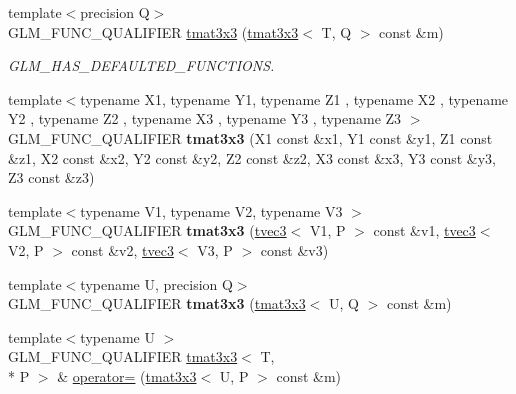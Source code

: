 \begin{DoxyCompactItemize}
\item 
\hypertarget{structglm_1_1tmat3x3_a7d0662c2d46d1709c245e21181f3adff}{{\footnotesize template$<$precision Q$>$ }\\G\-L\-M\-\_\-\-F\-U\-N\-C\-\_\-\-Q\-U\-A\-L\-I\-F\-I\-E\-R \hyperlink{structglm_1_1tmat3x3_a7d0662c2d46d1709c245e21181f3adff}{tmat3x3} (\hyperlink{structglm_1_1tmat3x3}{tmat3x3}$<$ T, Q $>$ const \&m)}\label{structglm_1_1tmat3x3_a7d0662c2d46d1709c245e21181f3adff}

\begin{DoxyCompactList}\small\item\em G\-L\-M\-\_\-\-H\-A\-S\-\_\-\-D\-E\-F\-A\-U\-L\-T\-E\-D\-\_\-\-F\-U\-N\-C\-T\-I\-O\-N\-S. \end{DoxyCompactList}\item 
\hypertarget{structglm_1_1tmat3x3_a5749217af8cef0e358589308774bf132}{{\footnotesize template$<$typename X1, typename Y1, typename Z1 , typename X2 , typename Y2 , typename Z2 , typename X3 , typename Y3 , typename Z3 $>$ }\\G\-L\-M\-\_\-\-F\-U\-N\-C\-\_\-\-Q\-U\-A\-L\-I\-F\-I\-E\-R {\bfseries tmat3x3} (X1 const \&x1, Y1 const \&y1, Z1 const \&z1, X2 const \&x2, Y2 const \&y2, Z2 const \&z2, X3 const \&x3, Y3 const \&y3, Z3 const \&z3)}\label{structglm_1_1tmat3x3_a5749217af8cef0e358589308774bf132}

\item 
\hypertarget{structglm_1_1tmat3x3_a065a41b6dbbc35bc4785e7f429359a2f}{{\footnotesize template$<$typename V1, typename V2, typename V3 $>$ }\\G\-L\-M\-\_\-\-F\-U\-N\-C\-\_\-\-Q\-U\-A\-L\-I\-F\-I\-E\-R {\bfseries tmat3x3} (\hyperlink{structglm_1_1tvec3}{tvec3}$<$ V1, P $>$ const \&v1, \hyperlink{structglm_1_1tvec3}{tvec3}$<$ V2, P $>$ const \&v2, \hyperlink{structglm_1_1tvec3}{tvec3}$<$ V3, P $>$ const \&v3)}\label{structglm_1_1tmat3x3_a065a41b6dbbc35bc4785e7f429359a2f}

\item 
\hypertarget{structglm_1_1tmat3x3_afdeefb27eb8d3d2a1b10d08487e6a1c9}{{\footnotesize template$<$typename U, precision Q$>$ }\\G\-L\-M\-\_\-\-F\-U\-N\-C\-\_\-\-Q\-U\-A\-L\-I\-F\-I\-E\-R {\bfseries tmat3x3} (\hyperlink{structglm_1_1tmat3x3}{tmat3x3}$<$ U, Q $>$ const \&m)}\label{structglm_1_1tmat3x3_afdeefb27eb8d3d2a1b10d08487e6a1c9}

\item 
\hypertarget{structglm_1_1tmat3x3_a3d87b69cdea2bbbcca29b6ba356ae943}{{\footnotesize template$<$typename U $>$ }\\G\-L\-M\-\_\-\-F\-U\-N\-C\-\_\-\-Q\-U\-A\-L\-I\-F\-I\-E\-R \hyperlink{structglm_1_1tmat3x3}{tmat3x3}$<$ T, \\*
P $>$ \& \hyperlink{structglm_1_1tmat3x3_a3d87b69cdea2bbbcca29b6ba356ae943}{operator=} (\hyperlink{structglm_1_1tmat3x3}{tmat3x3}$<$ U, P $>$ const \&m)}\label{structglm_1_1tmat3x3_a3d87b69cdea2bbbcca29b6ba356ae943}


\end{DoxyCompactItemize}
